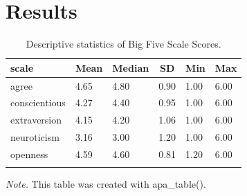 \documentclass[
  english,
  man,floatsintext]{apa6}
\begin{document}
\hypertarget{results}{%
\section{Results}\label{results}}

\begin{table}[tbp]

\begin{center}
\begin{threeparttable}

\caption{\label{tab:descrips-tab}Descriptive statistics of Big Five Scale Scores.}

\begin{tabular}{llllll}
\toprule
scale & \multicolumn{1}{c}{Mean} & \multicolumn{1}{c}{Median} & \multicolumn{1}{c}{SD} & \multicolumn{1}{c}{Min} & \multicolumn{1}{c}{Max}\\
\midrule
agree & 4.65 & 4.80 & 0.90 & 1.00 & 6.00\\
conscientious & 4.27 & 4.40 & 0.95 & 1.00 & 6.00\\
extraversion & 4.15 & 4.20 & 1.06 & 1.00 & 6.00\\
neuroticism & 3.16 & 3.00 & 1.20 & 1.00 & 6.00\\
openness & 4.59 & 4.60 & 0.81 & 1.20 & 6.00\\
\bottomrule
\addlinespace
\end{tabular}

\begin{tablenotes}[para]
\normalsize{\textit{Note.} This table was created with apa\_table().}
\end{tablenotes}

\end{threeparttable}
\end{center}

\end{table}
\end{document}
